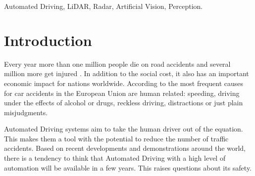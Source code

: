 \documentclass[journal]{IEEEtran}
\begin{document}
\begin{IEEEkeywords}
Automated Driving, LiDAR, Radar, Artificial Vision, Perception.
\end{IEEEkeywords}






%
\IEEEpeerreviewmaketitle




\section{Introduction}
\label{sec:01-intro}

Every year more than one million people die on road accidents and several 
million more get injured \cite{world2015global}. In addition to the social cost, it also has an
important economic impact for nations worldwide. According to 
\cite{Thomas2013} the most frequent causes for car accidents in the
European Union are human related: speeding, driving under the effects of
alcohol or drugs, reckless driving, distractions or just plain misjudgments.

Automated Driving systems aim to take the human driver out of the equation. 
This makes them a tool with the potential to reduce the number of traffic 
accidents.
Based on recent developments and demonstrations around the world, there is a 
tendency to think that Automated Driving with a high level of automation will 
be available in a few years. This raises questions about its safety. 
%
\end{document}
